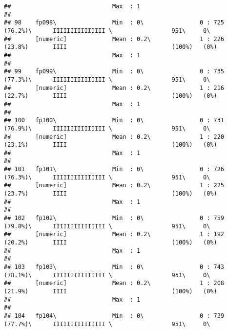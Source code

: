 \documentclass[]{article}
\begin{document}
\begin{verbatim}
##                             Max  : 1                                                                                           
## 
## 98    fp098\                Min  : 0\                0 : 725 (76.2%)\      IIIIIIIIIIIIIII \                 951\     0\       
##       [numeric]             Mean : 0.2\              1 : 226 (23.8%)       IIII                              (100%)   (0%)     
##                             Max  : 1                                                                                           
## 
## 99    fp099\                Min  : 0\                0 : 735 (77.3%)\      IIIIIIIIIIIIIII \                 951\     0\       
##       [numeric]             Mean : 0.2\              1 : 216 (22.7%)       IIII                              (100%)   (0%)     
##                             Max  : 1                                                                                           
## 
## 100   fp100\                Min  : 0\                0 : 731 (76.9%)\      IIIIIIIIIIIIIII \                 951\     0\       
##       [numeric]             Mean : 0.2\              1 : 220 (23.1%)       IIII                              (100%)   (0%)     
##                             Max  : 1                                                                                           
## 
## 101   fp101\                Min  : 0\                0 : 726 (76.3%)\      IIIIIIIIIIIIIII \                 951\     0\       
##       [numeric]             Mean : 0.2\              1 : 225 (23.7%)       IIII                              (100%)   (0%)     
##                             Max  : 1                                                                                           
## 
## 102   fp102\                Min  : 0\                0 : 759 (79.8%)\      IIIIIIIIIIIIIII \                 951\     0\       
##       [numeric]             Mean : 0.2\              1 : 192 (20.2%)       IIII                              (100%)   (0%)     
##                             Max  : 1                                                                                           
## 
## 103   fp103\                Min  : 0\                0 : 743 (78.1%)\      IIIIIIIIIIIIIII \                 951\     0\       
##       [numeric]             Mean : 0.2\              1 : 208 (21.9%)       IIII                              (100%)   (0%)     
##                             Max  : 1                                                                                           
## 
## 104   fp104\                Min  : 0\                0 : 739 (77.7%)\      IIIIIIIIIIIIIII \                 951\     0\       

\end{verbatim}
\end{document}
